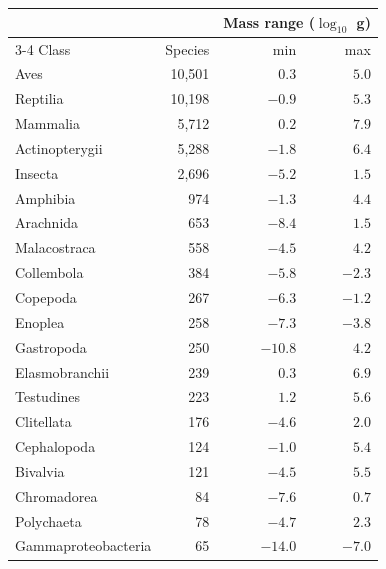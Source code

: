 \begin{tabular}{lrrr}
\toprule
 & & \multicolumn{2}{c}{Mass range ($\log_{10}$ g)} \\
\cmidrule(l){3-4}
Class & Species & min & max \\
\midrule
Aves & 10{,}501 & $0.3$ & $5.0$ \\
Reptilia & 10{,}198 & $-0.9$ & $5.3$ \\
Mammalia & 5{,}712 & $0.2$ & $7.9$ \\
Actinopterygii & 5{,}288 & $-1.8$ & $6.4$ \\
Insecta & 2{,}696 & $-5.2$ & $1.5$ \\
Amphibia & 974 & $-1.3$ & $4.4$ \\
Arachnida & 653 & $-8.4$ & $1.5$ \\
Malacostraca & 558 & $-4.5$ & $4.2$ \\
Collembola & 384 & $-5.8$ & $-2.3$ \\
Copepoda & 267 & $-6.3$ & $-1.2$ \\
Enoplea & 258 & $-7.3$ & $-3.8$ \\
Gastropoda & 250 & $-10.8$ & $4.2$ \\
Elasmobranchii & 239 & $0.3$ & $6.9$ \\
Testudines & 223 & $1.2$ & $5.6$ \\
Clitellata & 176 & $-4.6$ & $2.0$ \\
Cephalopoda & 124 & $-1.0$ & $5.4$ \\
Bivalvia & 121 & $-4.5$ & $5.5$ \\
Chromadorea & 84 & $-7.6$ & $0.7$ \\
Polychaeta & 78 & $-4.7$ & $2.3$ \\
Gammaproteobacteria & 65 & $-14.0$ & $-7.0$ \\
\bottomrule
\end{tabular}
